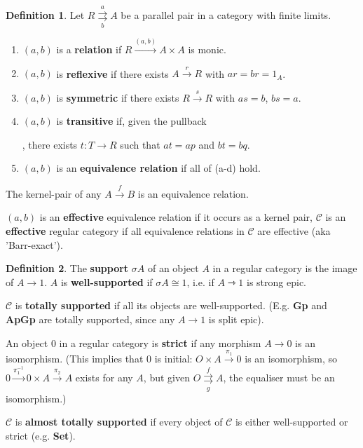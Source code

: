 \documentclass[a4paper]{article}
\theoremstyle{definition}
\newtheorem{definition}{Definition}
\theoremstyle{remark}
\theoremstyle{default}
\numberwithin{definition}{section}
\newcommand*\parallelpair[2]{\overset{#1}{\underset{#2}{\rightrightarrows}}}
\begin{document}
\begin{definition}
	Let $R \parallelpair{a}{b} A$ be a parallel pair in a category with finite limits.
	\begin{enumerate}[label=\alph*.]
		\item $(a, b)$ is a \textbf{relation} if $R \overset{(a,b)}{\longrightarrow} A \times A$ is monic.
		\item $(a,b)$ is \textbf{reflexive} if there exists $A \overset{r}{\to} R$ with $ar = br = 1_A$.
		\item $(a, b)$ is \textbf{symmetric} if there exists $R \overset{s}{\to} R$ with $as = b$, $bs = a$.
		\item $(a, b)$ is \textbf{transitive} if, given the pullback
			,
			there exists $t: T \to R$ such that $at = ap$ and $bt = bq$.
		\item $(a, b)$ is an \textbf{equivalence relation} if all of (a-d) hold.	
	\end{enumerate}
	The kernel-pair of any $A \overset{f}{\to} B$ is an equivalence relation.
	
	$(a, b)$ is an \textbf{effective} equivalence relation if it occurs as a kernel pair,
	$\mathcal{C}$ is an \textbf{effective} regular category if all equivalence relations in $\mathcal{C}$ are effective (aka 'Barr-exact').	
\end{definition}

\begin{definition}
	The \textbf{support} $\sigma A$ of an object $A$ in a regular category is the image of $A \to 1$.
	$A$ is \textbf{well-supported} if $\sigma A \cong 1$,
	i.e. if $A \rightarrowtriangle 1$ is strong epic.
	
	$\mathcal{C}$ is \textbf{totally supported} if all its objects are well-supported.
	(E.g. \textbf{Gp} and \textbf{ApGp} are totally supported,
	since any $A \to 1$ is split epic).
	
	An object $0$ in a regular category is \textbf{strict} if any morphism $A \to 0$ is an isomorphism.
	(This implies that $0$ is initial: $O \times A \overset{\pi_1}{\to} 0$ is an isomorphism,
	so $0 \overset{\pi_1^{-1}}{\to} 0 \times A \overset{\pi_2}{\to} A$ exists for any $A$,
	but given $O \parallelpair{f}{g} A$,
	the equaliser must be an isomorphism.)
	
	$\mathcal{C}$ is \textbf{almost totally supported} if every object of $\mathcal{C}$ is either well-supported or strict (e.g. \textbf{Set}).
\end{definition}
\end{document}
